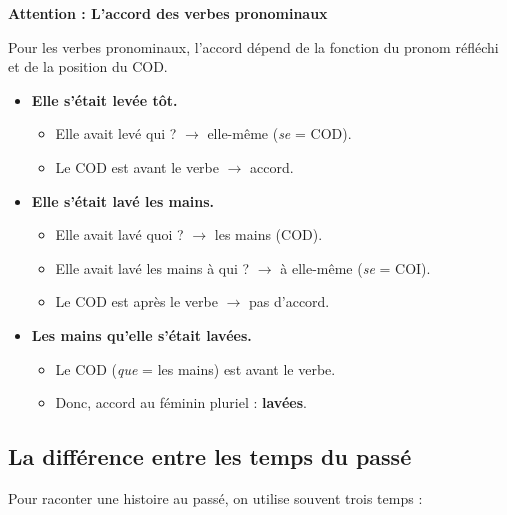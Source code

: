 \documentclass[math,code]{amznotes}
\theoremstyle{remark}
\begin{document}
\begin{notebox}
\textbf{Attention : L'accord des verbes pronominaux}

Pour les verbes pronominaux, l'accord dépend de la fonction du pronom réfléchi et de la position du COD.

\begin{itemize}
    \item \textbf{Elle s'était levée tôt.}
    \begin{itemize}
        \item Elle avait levé qui ? $\rightarrow$ elle-même (\textit{se} = COD).
        \item Le COD est avant le verbe $\rightarrow$ accord.
    \end{itemize}

    \item \textbf{Elle s'était lavé les mains.}
    \begin{itemize}
        \item Elle avait lavé quoi ? $\rightarrow$ les mains (COD).
        \item Elle avait lavé les mains à qui ? $\rightarrow$ à elle-même (\textit{se} = COI).
        \item Le COD est après le verbe $\rightarrow$ pas d'accord.
    \end{itemize}

    \item \textbf{Les mains qu'elle s'était lavées.}
    \begin{itemize}
        \item Le COD (\textit{que} = les mains) est avant le verbe.
        \item Donc, accord au féminin pluriel : \textbf{lavées}.
    \end{itemize}
\end{itemize}
\end{notebox}

\subsection*{La différence entre les temps du passé}

Pour raconter une histoire au passé, on utilise souvent trois temps :
\end{document}
